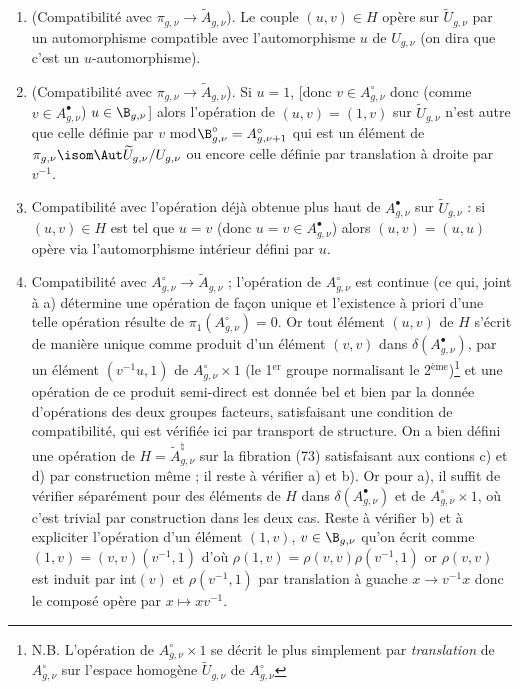 \begin{enumerate}
    \item[a)] (Compatibilité avec $\pi_{g, \nu} \to \widetilde{A}_{g, \nu}$). Le couple $(u, v) \in H$ opère sur $\widetilde{U}_{g, \nu}$ par un automorphisme compatible avec l'automorphisme $u$ de $U_{g, \nu}$ (on dira que c'est un $u$-automorphisme). 
    \item[b)] (Compatibilité avec $\pi_{g, \nu} \to \widetilde{A}_{g, \nu}$). Si $u = 1$, [donc $v \in A^\circ_{g, \nu}$ donc (comme $v \in A^\bullet_{g, \nu}$) $u \in \B_{g, \nu}$] alors l'opération de $(u, v) = (1, v)$ sur $\widetilde{U}_{g, \nu}$ n'est autre que celle définie par $v$ mod$\B^\circ_{g, \nu} = A^\circ_{g, \nu + 1}$ qui est un élément de $\pi_{g, \nu} \isom \Aut \widetilde{U}_{g, \nu}/U_{g, \nu}$ ou encore celle définie par translation à droite par $v^{-1}$.
    \item[c)] Compatibilité avec l'opération déjà obtenue plus haut de $A^\bullet_{g, \nu}$ sur $\widetilde{U}_{g, \nu}$ : si $(u, v) \in H$ est tel que $u = v$ (donc $u = v \in A^\bullet_{g, \nu}$) alors $(u, v) = (u, u)$ opère via l'automorphisme intérieur défini par $u$.
    \item[d)] Compatibilité avec $A^\circ_{g, \nu} \to \widetilde{A}_{g, \nu}$ ; l'opération de $A^\circ_{g, \nu}$ est continue (ce qui, joint à a) détermine une opération de fa\c{c}on unique et l'existence à priori d'une telle opération résulte de $\pi_1(A^\circ_{g, \nu}) = 0$. Or tout élément $(u, v)$ de $H$ s'écrit de manière unique comme produit d'un élément $(v, v)$ dans $\delta (A^\bullet_{g, \nu})$, par un élément $(v^{-1}u, 1)$ de $A^\circ_{g, \nu} \times 1$ (le 1$^{\text{er}}$ groupe normalisant le 2$^{\text{ème}}$)\footnote{N.B. L'opération de $A^\circ_{g, \nu} \times 1$ se décrit le plus simplement par \emph{translation} de $A^\circ_{g, \nu}$ sur l'espace homogène $\widetilde{U}_{g, \nu}$ de $A^\circ_{g, \nu}$} et une opération de ce produit semi-direct est donnée bel et bien par la donnée d'opérations des deux groupes facteurs, satisfaisant une condition de compatibilité, qui est vérifiée ici par transport de structure. On a bien défini une opération de $H = \widetilde{A}^\natural_{g, \nu}$ sur la fibration (73) satisfaisant aux contions c) et d) par construction même ; il reste à vérifier a) et b). Or pour a), il suffit de vérifier séparément pour des éléments de $H$ dans $\delta (A^\bullet_{g, \nu})$ et de $A^\circ_{g, \nu} \times 1$, où c'est trivial par construction dans les deux cas. Reste à vérifier b) et à expliciter l'opération d'un élément $(1, v)$, $v \in \B_{g, \nu}$ qu'on écrit comme $(1, v) = (v, v)(v^{-1}, 1)$ d'où $\rho (1, v) = \rho(v, v) \rho(v^{-1}, 1)$ or $\rho(v, v)$ est induit par int$(v)$ et $\rho(v^{-1}, 1)$ par translation à guache $x \to v^{-1}x$ donc le composé opère par $x \mapsto xv^{-1}$.
\end{enumerate}
